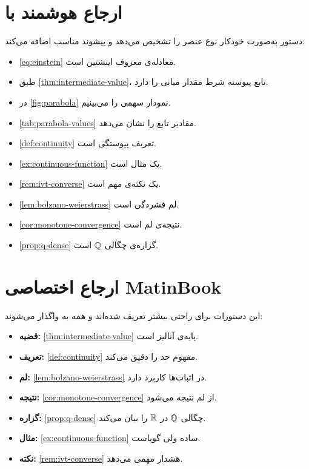 \documentclass{matinbook}
\begin{document}
\section{ارجاع هوشمند با }
\label{sec:ref-cleveref}

دستور  به‌صورت خودکار نوع عنصر
را تشخیص می‌دهد و پیشوند مناسب اضافه می‌کند:

\begin{itemize}
    \item \cref{eq:einstein} معادله‌ی معروف اینشتین است.
    \item طبق \cref{thm:intermediate-value}، تابع پیوسته
    شرط مقدار میانی را دارد.
    \item در \cref{fig:parabola} نمودار سهمی را می‌بینیم.
    \item \cref{tab:parabola-values} مقادیر تابع را نشان
    می‌دهد.
    \item \cref{def:continuity} تعریف پیوستگی است.
    \item \cref{ex:continuous-function} یک مثال است.
    \item \cref{rem:ivt-converse} یک نکته‌ی مهم است.
    \item \cref{lem:bolzano-weierstrass} لم فشردگی است.
    \item \cref{cor:monotone-convergence} نتیجه‌ی لم است.
    \item \cref{prop:q-dense} گزاره‌ی چگالی $\mathbb{Q}$ است.
\end{itemize}

\section{ارجاع اختصاصی MatinBook}
\label{sec:ref-helpers}

این دستورات برای راحتی بیشتر تعریف شده‌اند و همه به
 واگذار می‌شوند:

\begin{itemize}
    \item \textbf{قضیه:} \cref{thm:intermediate-value}
    پایه‌ی آنالیز است.
    \item \textbf{تعریف:} \cref{def:continuity} مفهوم
    حد را دقیق می‌کند.
    \item \textbf{لم:} \cref{lem:bolzano-weierstrass}
    در اثبات‌ها کاربرد دارد.
    \item \textbf{نتیجه:} \cref{cor:monotone-convergence}
    از لم نتیجه می‌شود.
    \item \textbf{گزاره:} \cref{prop:q-dense} چگالی
    $\mathbb{Q}$ در $\mathbb{R}$ را بیان می‌کند.
    \item \textbf{مثال:} \cref{ex:continuous-function}
    ساده ولی گویاست.
    \item \textbf{نکته:} \cref{rem:ivt-converse} هشدار
    مهمی می‌دهد.
\end{itemize}
\end{document}
